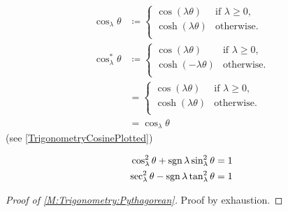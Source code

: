 \documentclass[../methodology.tex]{subfiles}
\begin{document}
\begin{example}\label{M:Trigonometry:Cosine}
    \begin{align*}
        \cos_\lambda{\theta}
         & \coloneqq
        \begin{cases}
            \cos\left(\lambda\theta\right)  & \text{if \(\lambda\geq0\),} \\
            \cosh\left(\lambda\theta\right) & \text{otherwise.}           \\
        \end{cases}     \\
        \cos_\lambda^\ast{\theta}
         & \coloneqq
        \begin{cases}
            \cos\left(\lambda\theta\right)   & \text{if \(\lambda\geq0\),} \\
            \cosh\left(-\lambda\theta\right) & \text{otherwise.}           \\
        \end{cases}    \\
         & =\begin{cases}
                \cos\left(\lambda\theta\right)  & \text{if \(\lambda\geq0\),} \\
                \cosh\left(\lambda\theta\right) & \text{otherwise.}           \\
            \end{cases} \\
         & =\cos_\lambda{\theta}
    \end{align*}
    (see \cref{TrigonometryCosinePlotted})
\end{example}
\begin{theorem}\label{M:Trigonometry:Pythagorean}
    \begin{align*}
        \cos_\lambda^2{\theta}+\operatorname{sgn}{\lambda}\sin_\lambda^2{\theta} & =1 \\
        \sec_\lambda^2{\theta}-\operatorname{sgn}{\lambda}\tan_\lambda^2{\theta} & =1 \\
    \end{align*}
\end{theorem}
\begin{proof}[Proof of \cref{M:Trigonometry:Pythagorean}]
    Proof by exhaustion.
\end{proof}
\end{document}
